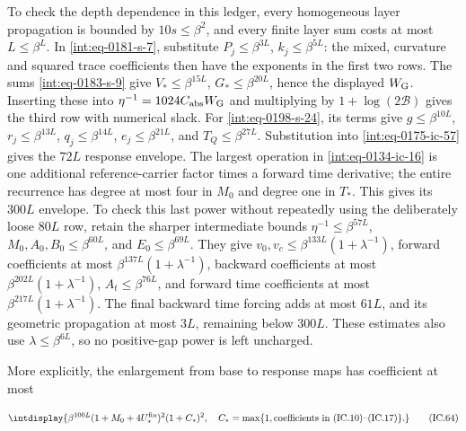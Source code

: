To check the depth dependence in this ledger, every homogeneous layer propagation is bounded by \(10s\le\beta^2\), and every finite layer sum costs at most \(L\le\beta^L\). In \eqref{int:eq-0181-s-7}, substitute \(P_j\le\beta^{3L}\), \(k_j\le\beta^{5L}\): the mixed, curvature and squared trace coefficients then have the exponents in the first two rows. The sums \eqref{int:eq-0183-s-9} give \(V_*\le\beta^{15L}\), \(G_*\le\beta^{20L}\), hence the displayed \(W_{\rm G}\). Inserting these into \(\eta^{-1}=1024C_{\rm abs}W_{\rm G}\) and multiplying by \(1+\log(2\mathcal B)\) gives the third row with numerical slack. For \eqref{int:eq-0198-s-24}, its terms give \(g\le\beta^{10L}\), \(r_j\le\beta^{13L}\), \(q_j\le\beta^{14L}\), \(e_j\le\beta^{21L}\), and \(T_Q\le\beta^{27L}\). Substitution into \eqref{int:eq-0175-ic-57} gives the \(72L\) response envelope. The largest operation in \eqref{int:eq-0134-ic-16} is one additional reference-carrier factor times a forward time derivative; the entire recurrence has degree at most four in \(M_0\) and degree one in \(T_*\). This gives its \(300L\) envelope. To check this last power without repeatedly using the deliberately loose \(80L\) row, retain the sharper intermediate bounds \(\eta^{-1}\le\beta^{57L}\), \(M_0,\allowbreak A_0,\allowbreak B_0\le\beta^{60L}\), and \(E_0\le\beta^{69L}\). They give \(v_0,\allowbreak v_c\le\beta^{133L}(1+\lambda^{-1})\), forward coefficients at most \(\beta^{137L}(1+\lambda^{-1})\), backward coefficients at most \(\beta^{202L}(1+\lambda^{-1})\), \(A_t\le\beta^{76L}\), and forward time coefficients at most \(\beta^{217L}(1+\lambda^{-1})\). The final backward time forcing adds at most \(61L\), and its geometric propagation at most \(3L\), remaining below \(300L\). These estimates also use \(\lambda\le\beta^{6L}\), so no positive-gap power is left uncharged.



More explicitly, the enlargement from base to response maps has coefficient at most


\begingroup\renewcommand{\theHequation}{intdisplay.658}
\begin{equation}
\intdisplay{
\beta^{100L}(1+M_0+4U_*^{\rm fin})^2(1+C_*)^2,
 \quad C_*=\max\{1,\hbox{coefficients in (IC.10)--(IC.17)}\}.
}
\tag{IC.64}
\label{int:eq-0279-ic-64}
\end{equation}
\endgroup


